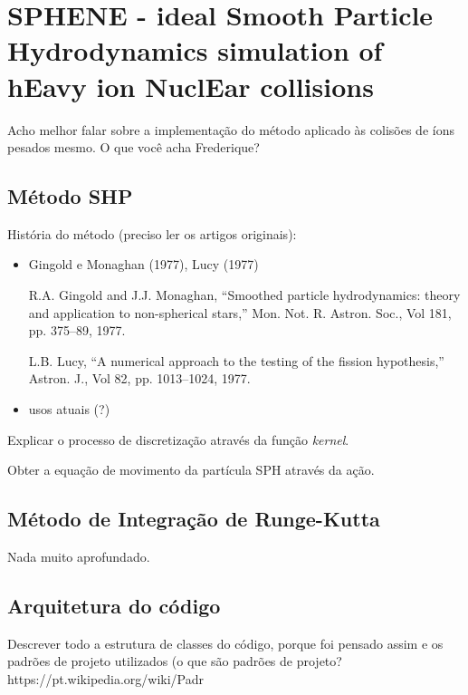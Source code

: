 \documentclass[a4paper,12pt]{article}
\begin{document}
\title{}

\author{Aluno: Rafael M. Miller NUSP.: 7581818}

\maketitle

\section{SPHENE - ideal Smooth Particle Hydrodynamics simulation of hEavy ion NuclEar collisions}

Acho melhor falar sobre a implementação do método aplicado às colisões de íons pesados mesmo. O que você acha Frederique?

\subsection{Método SHP}

História do método (preciso ler os artigos originais):
\begin{itemize}
  \item Gingold e Monaghan (1977), Lucy (1977)

  R.A. Gingold and J.J. Monaghan, ``Smoothed particle hydrodynamics: theory and application to non-spherical stars,'' Mon. Not. R. Astron. Soc., Vol 181, pp. 375–89, 1977.

  L.B. Lucy, ``A numerical approach to the testing of the fission hypothesis,'' Astron. J., Vol 82, pp. 1013–1024, 1977.
  \item usos atuais (?)
\end{itemize}

Explicar o processo de discretização através da função {\it kernel}.

Obter a equação de movimento da partícula SPH através da ação.

\subsection{Método de Integração de Runge-Kutta}

Nada muito aprofundado.

\subsection{Arquitetura do código}

Descrever todo a estrutura de classes do código, porque foi pensado assim e os padrões de projeto utilizados (o que são padrões de projeto? https://pt.wikipedia.org/wiki/Padr%
\end{document}
